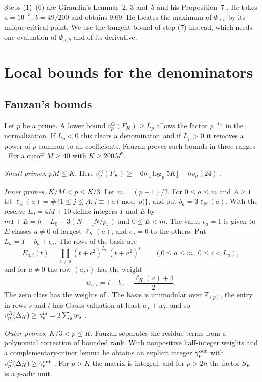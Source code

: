 \documentclass[11pt]{amsart}
\theoremstyle{definition}
\theoremstyle{remark}
\numberwithin{equation}{section}
\newcommand{\Z}{\mathbb Z}
\newcommand{\vG}{v_p^{\mathrm G}}
\begin{document}
Steps (1)--(6) are Giraudin's Lemmas~2, 3 and~5 and his Proposition~7 \cite{Giraudin26z5}. He takes
$a=10^{-3}$, $b=49/200$ and obtains $9.09$. He locates the maximum of $\Phi_{a,b}$ by its unique critical point. We use
the tangent bound of step (7) instead, which needs one evaluation of $\Phi_{a,b}$ and of its derivative.

\section{Local bounds for the denominators}\label{sec:local}

\subsection{Fauzan's bounds}
Let $p$ be a prime. A lower bound $\vG(F_K)\ge L_p$ allows the factor $p^{-L_p}$ in the normalization. If $L_p<0$ this
clears a denominator, and if $L_p>0$ it removes a power of $p$ common to all coefficients. Fauzan proves such bounds in
three ranges \cite[\S\S3--5]{Fauzan2026}. Fix a cutoff $M\ge40$ with $K\ge200M^2$.

\emph{Small primes}, $pM\le K$. Here $\vG(F_K)\ge-6h\lfloor\log_p5K\rfloor-hv_p(24)$
\cite[(3.12)]{Fauzan2026}.

\emph{Inner primes}, $K/M<p\le K/3$. Let $m=(p-1)/2$. For $0\le a\le m$ and $A\ge1$ let
$\ell_A(a)=\#\{1\le j\le A:j\equiv\pm a\pmod p\}$, and put $b_a=3\ell_N(a)$. With the reserve $L_0=4M+10$ define
integers $T$ and $E$ by $mT+E=h-L_0+3(N-\lfloor N/p\rfloor)$ and $0\le E<m$. The value $\epsilon_a=1$ is given to $E$
classes $a\ne0$ of largest $\ell_K(a)$, and $\epsilon_a=0$ to the others. Put $L_a=T-b_a+\epsilon_a$. The rows of the
basis are
\begin{equation}\label{eq:basis}
 E_{a,i}(t)=\prod_{c\ne a}(t+c^2)^{L_c}\,(t+a^2)^i\qquad(0\le a\le m,\ 0\le i<L_a),
\end{equation}
and for $a\ne0$ the row $(a,i)$ has the weight
\begin{equation}\label{eq:weights}
 w_{a,i}=i+b_a-\frac{\ell_K(a)+4}2 .
\end{equation}
The zero class has the weights of \cite[(4.7)]{Fauzan2026}. The basis is unimodular over $\Z_{(p)}$, the entry in rows
$s$ and $t$ has Gauss valuation at least $w_s+w_t$, and so $\vG(\Delta_K)\ge\gamma^{\rm in}_p=2\sum_sw_s$
\cite[Proposition~4.1]{Fauzan2026}.

\emph{Outer primes}, $K/3<p\le K$. Fauzan separates the residue terms from a polynomial correction of bounded rank.
With nonpositive half-integer weights and a complementary-minor lemma he obtains an explicit integer $\gamma^{\rm out}_p$
with $\vG(\Delta_K)\ge\gamma^{\rm out}_p$ \cite[(4.14) and Proposition~4.3]{Fauzan2026}. For $p>K$ the matrix is
integral, and for $p>2h$ the factor $S_K$ is a $p$-adic unit.
\end{document}
